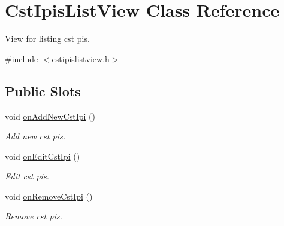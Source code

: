 \hypertarget{class_cst_ipis_list_view}{\section{\-Cst\-Ipis\-List\-View \-Class \-Reference}
\label{class_cst_ipis_list_view}
}


\-View for listing cst pis.  




{\ttfamily \#include $<$cstipislistview.\-h$>$}

\subsection*{\-Public \-Slots}
\begin{DoxyCompactItemize}
\item 
void \hyperlink{class_cst_ipis_list_view_a93591905922ec1ffd796c6e5c3b94ff5}{on\-Add\-New\-Cst\-Ipi} ()
\begin{DoxyCompactList}\small\item\em \-Add new cst pis. \end{DoxyCompactList}\item 
void \hyperlink{class_cst_ipis_list_view_aa1b6dbf2e8d9e95f104c8b7f48a1cc0e}{on\-Edit\-Cst\-Ipi} ()
\begin{DoxyCompactList}\small\item\em \-Edit cst pis. \end{DoxyCompactList}\item 
void \hyperlink{class_cst_ipis_list_view_a7b9824496401d4630218d726b84cee28}{on\-Remove\-Cst\-Ipi} ()
\begin{DoxyCompactList}\small\item\em \-Remove cst pis. \end{DoxyCompactList}\end{DoxyCompactItemize}
